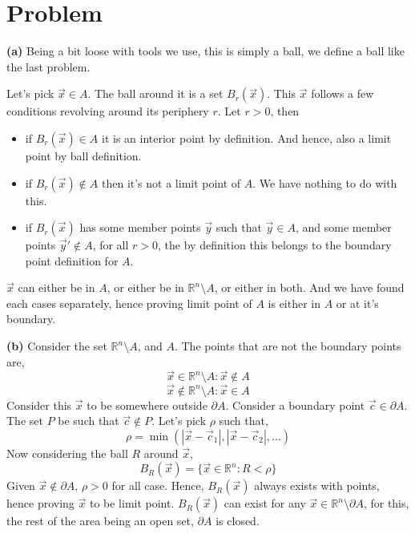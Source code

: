 \documentclass[letter]{article}
\begin{document}
\section{Problem}
\textbf{(a)}
Being a bit loose with tools we use, this is simply a ball, we define a ball like the last problem. 

Let's pick $\vec{x} \in A$. The ball around it is a set $B_r(\vec{x})$. This $\vec{x}$ follows a few conditions revolving around its periphery $r$. Let $r>0$, then 
\begin{itemize}
	\item if $B_r(\vec{x}) \in A$ it is an interior point by definition. And hence, also a limit point by ball definition. 
	\item if $B_r(\vec{x}) \not\in A$ then it's not a limit point of $A$. We have nothing to do with this. 
	\item if $B_r(\vec{x})$ has some member points $\vec{y}$ such that $\vec{y} \in A$, and some member points $\vec{y}' \not\in A$, for all $r>0$, the by definition this belongs to the boundary point definition for $A$. 
\end{itemize}
$\vec{x}$ can either be in $A$, or either be in $\mathbb{R}^{n}\setminus A$, or either in both. And we have found each cases separately, hence proving limit point of $A$ is either in $A$ or at it's boundary. 

\textbf{(b)} Consider the set $\mathbb{R}^{n}  \setminus A$, and $A$. The points that are not the boundary points are, 
\[
\vec{x} \in \mathbb{R}^{n} \setminus A : \vec{x} \not\in A
\] \[
\vec{x} \not\in \mathbb{R}^{n} \setminus A : \vec{x} \in A
\] 
Consider this $\vec{x}$ to be somewhere outside $\partial A$. Consider a boundary point $\vec{c} \in  \partial A$. The set $P$ be such that $\vec{c} \not\in P$. Let's pick $\rho $ such that,
\[
\rho = \min(
|\vec{x} - \vec{c}_1|, |\vec{x}-\vec{c}_2|, \ldots
)
\] 
Now considering the ball $R$ around $\vec{x}$, 
\[
B_R(\vec{x}) = \{\vec{x} \in \mathbb{R}^{n}: R < \rho\} 
\]
Given $\vec{x} \not\in \partial A$, $\rho > 0$ for all case. Hence, $B_R(\vec{x})$ always exists with points, hence proving $\vec{x}$ to be limit point. $B_R(\vec{x}) $ can exist for any $\vec{x} \in \mathbb{R}^{n}\setminus \partial A$, for this, the rest of the area being an open set, $\partial A$ is closed.
\end{document}
